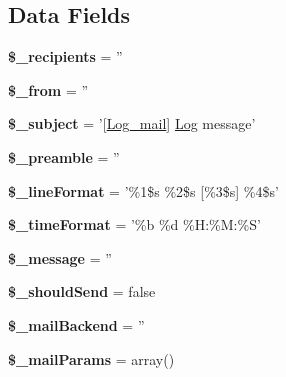 \subsection*{Data Fields}
\begin{DoxyCompactItemize}
\item 
\hypertarget{class_log__mail_aa5f5e78dd9477bdec18b4aadae77ba13}{
{\bfseries \$\_\-recipients} = ''}
\label{class_log__mail_aa5f5e78dd9477bdec18b4aadae77ba13}

\item 
\hypertarget{class_log__mail_a3f8b6a1f1e371d8b24002e5378267380}{
{\bfseries \$\_\-from} = ''}
\label{class_log__mail_a3f8b6a1f1e371d8b24002e5378267380}

\item 
\hypertarget{class_log__mail_a3a212566602bb9c1c34e7619390b1bb8}{
{\bfseries \$\_\-subject} = '\mbox{[}\hyperlink{class_log__mail}{Log\_\-mail}\mbox{]} \hyperlink{class_log}{Log} message'}
\label{class_log__mail_a3a212566602bb9c1c34e7619390b1bb8}

\item 
\hypertarget{class_log__mail_adafcf85d78f28c468b77704c1b953694}{
{\bfseries \$\_\-preamble} = ''}
\label{class_log__mail_adafcf85d78f28c468b77704c1b953694}

\item 
\hypertarget{class_log__mail_a987ec493419026385e852e1fbbc68543}{
{\bfseries \$\_\-lineFormat} = '\%1\$s \%2\$s \mbox{[}\%3\$s\mbox{]} \%4\$s'}
\label{class_log__mail_a987ec493419026385e852e1fbbc68543}

\item 
\hypertarget{class_log__mail_a7b5dae11e5c85b90db946240cb9d4e42}{
{\bfseries \$\_\-timeFormat} = '\%b \%d \%H:\%M:\%S'}
\label{class_log__mail_a7b5dae11e5c85b90db946240cb9d4e42}

\item 
\hypertarget{class_log__mail_a5aa69aa9837e33d90b23e70bca1f1d18}{
{\bfseries \$\_\-message} = ''}
\label{class_log__mail_a5aa69aa9837e33d90b23e70bca1f1d18}

\item 
\hypertarget{class_log__mail_a38c59d95de1a8424f27b2b0d12368df4}{
{\bfseries \$\_\-shouldSend} = false}
\label{class_log__mail_a38c59d95de1a8424f27b2b0d12368df4}

\item 
\hypertarget{class_log__mail_a02e64684413a2f198279f0558634b199}{
{\bfseries \$\_\-mailBackend} = ''}
\label{class_log__mail_a02e64684413a2f198279f0558634b199}

\item 
\hypertarget{class_log__mail_a617ca82d5b4e5c01cc3f67cf1ea16553}{
{\bfseries \$\_\-mailParams} = array()}
\label{class_log__mail_a617ca82d5b4e5c01cc3f67cf1ea16553}

\end{DoxyCompactItemize}


